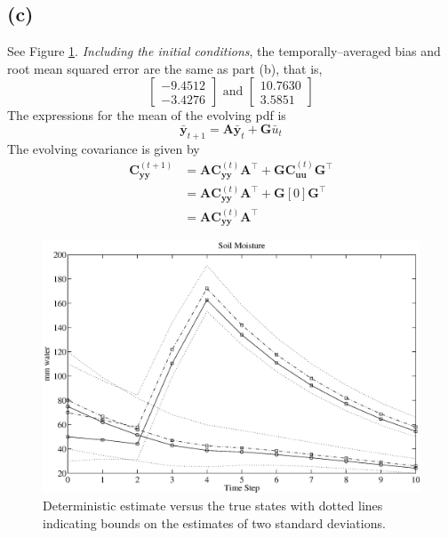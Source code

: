\documentclass[fleqn, letterpaper]{tufte-handout}
\begin{document}
\subsection{(c)}
See Figure \ref{ps5figc}. \emph{Including the initial conditions}, the temporally--averaged bias and root mean squared error are the same as part (b), that is,
\[
        \begin{bmatrix}
                -9.4512 \\
                -3.4276
        \end{bmatrix}
        \text{ and }
        \begin{bmatrix}
                10.7630 \\
                3.5851
        \end{bmatrix}
\]
The expressions for the mean of the evolving pdf is
\[
        \bar{\mathbf{y}}_{t+1} = \mathbf{A}\bar{\mathbf{y}}_t + \mathbf{G}\bar{u}_t
\]
The evolving covariance is given by
\begin{align*}
        \mathbf{C}_{\mathbf{yy}}^{(t+1)} &= \mathbf{AC}_{\mathbf{yy}}^{(t)}\mathbf{A}^\intercal + \mathbf{GC}_\mathbf{{uu}}^{(t)}\mathbf{G}^\intercal \\
                                         & = \mathbf{AC}_{\mathbf{yy}}^{(t)}\mathbf{A}^\intercal + \mathbf{G}[0]\mathbf{G}^\intercal \\
                                         & = \mathbf{AC}_{\mathbf{yy}}^{(t)}\mathbf{A}^\intercal 
\end{align*}

\begin{figure}
        \includegraphics[width=\textwidth]{ps5figc}
        \caption{Deterministic estimate versus the true states with dotted lines indicating bounds on the estimates of two standard deviations.}
        \label{ps5figc}
\end{figure}
\end{document}
